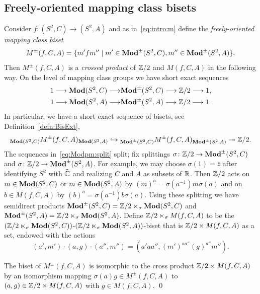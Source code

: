 \documentclass{amsart}
\begin{document}
\subsection{Freely-oriented mapping class bisets}
Consider $f\colon (S^2,C)\to (S^2,A)$ and as in~\eqref{eq:intro:m}
define the \emph{freely-oriented mapping class biset}
\[M^{\pm}(f,C,A)=\{m'fm''\mid m'\in\mathbf{\relax Mod}^{\pm}(S^2,C),m''\in\mathbf{\relax Mod}^{\pm}(S^2,A)\}.
\] 
Then $M^{\pm}(f,C,A)$ is a \emph{crossed product} of ${\mathbb Z}/2$ and $M(f,C,A)$ in
the following way. On the level of mapping class groups we have short
exact sequences
\begin{equation}\label{eq:Modpm:split}
  \begin{aligned}
1\longrightarrow \mathbf{\relax Mod}(S^2,C)\longrightarrow &\mathbf{\relax Mod}^{\pm}(S^2,C)\longrightarrow  {\mathbb Z}/2\longrightarrow 1,\\
1\longrightarrow \mathbf{\relax Mod}(S^2,A)\longrightarrow &\mathbf{\relax Mod}^{\pm}(S^2,A)\longrightarrow  {\mathbb Z}/2\longrightarrow 1.
 \end{aligned}
\end{equation}
In particular, we have a short exact sequence of bisets, see
Definition~\ref{defn:BisExt},
\begin{equation}\label{eq:SES:NonOrientMCB}
  \subscript{\Mod(S^2,C)}M^{\pm}(f,C,A)_{\Mod(S^2,A)}\hookrightarrow \subscript{\Mod^{\pm}(S^2,C)}M^{\pm}(f,C,A)_{\Mod^{\pm}(S^2,A)} \twoheadrightarrow  \Z/2.
\end{equation}
The sequences in~\eqref{eq:Modpm:split} split; fix splittings
$\sigma \colon {\mathbb Z}/2\to \mathbf{\relax Mod}^{\pm}(S^2,C)$ and
$\sigma \colon {\mathbb Z}/2\to \mathbf{\relax Mod}^{\pm}(S^2,A)$. For example, we may choose
$\sigma(1)=\bar z$ after identifying $S^2$ with $\widehat {{\mathbb C}}$ and
realizing $C$ and $A$ as subsets of ${\mathbb R}$. Then ${\mathbb Z}/2$ acts on
$m\in\mathbf{\relax Mod}(S^2,C)$ or $m\in\mathbf{\relax Mod}(S^2,A)$ by
$(m)^{a}= \sigma(a^{-1}) m\sigma(a)$ and on $b\in M(f,C,A)$ by
$(b)^{a}= \sigma(a^{-1}) b\sigma(a)$. Using these splitting we have
semidirect products
$\mathbf{\relax Mod}^{\pm}(S^2,C)={\mathbb Z}/2 \ltimes_\sigma \mathbf{\relax Mod}(S^2,C)$ and
$\mathbf{\relax Mod}^{\pm}(S^2,A)={\mathbb Z}/2 \ltimes_\sigma \mathbf{\relax Mod}(S^2,A)$. Define
${\mathbb Z}/2 \ltimes_\sigma M(f,C,A)$ to be the
$({\mathbb Z}/2 \ltimes_\sigma
\mathbf{\relax Mod}(S^2,C))$-$({\mathbb Z}/2 \ltimes_\sigma \mathbf{\relax Mod}(S^2,A))$-biset that is
${\mathbb Z}/2\times M(f,C,A)$ as a set, endowed with the actions
\begin{equation}
\label{eq:NonOrientMCB:CrossProd}
(a', m') \cdot (a, g)\cdot (a'', m'')=  (a' a a'', (m')^{a a''} (g)^{a''} m'').
\end{equation}
\begin{lem}
  The biset of $ M^{\pm}(f,C,A)$ is isomorphic to the cross product
  ${\mathbb Z}/2 \ltimes M(f,C,A)$ by an isomorphism mapping
  $\sigma(a) g\in M^{\pm}(f,C,A)$ to $(a,g)\in {\mathbb Z}/2\times M(f,C,A)$ with
  $g\in M(f,C,A)$.  \qed
\end{lem} 
  
\end{document}
